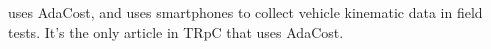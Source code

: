 \citep{MA2023103983} uses AdaCost, and uses smartphones to collect vehicle kinematic data in field tests.  It's the only article in TRpC that uses AdaCost.  